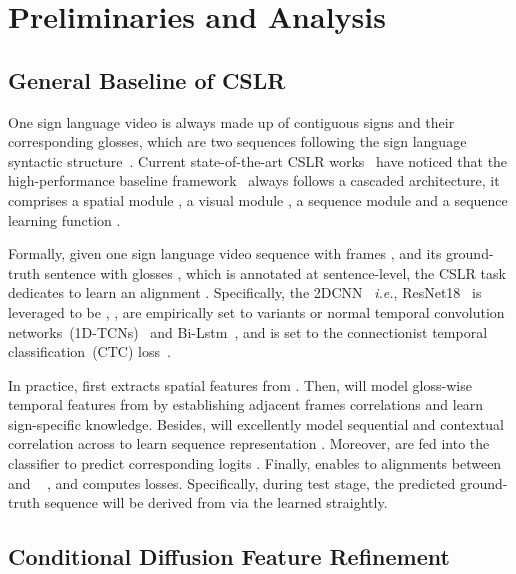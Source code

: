 \documentclass[sigconf]{acmart}
\begin{document}
\section{Preliminaries and Analysis}
\label{sec_pa}

\subsection{General Baseline of CSLR}
\label{sec_base}
One sign language video is always made up of contiguous signs and their corresponding glosses, which are two sequences following the sign language syntactic structure~\cite{sutton1999linguistics}.
Current state-of-the-art CSLR works~\cite{min2021visual,hao2021self,zuo2022c2slr,hu2022temporal,Hu2022SelfEmphasizingNF,hu2023continuous,CVTSLR2023} have noticed that the high-performance baseline framework~ always follows a cascaded architecture, it comprises a spatial module , a visual module , a sequence module  and 
a sequence learning function .

Formally, given one sign language video sequence with  frames , and its ground-truth sentence with  glosses , which is annotated at sentence-level, the CSLR task dedicates to learn an alignment . 
Specifically, the 2DCNN ~\textit{i.e.}, ResNet18~\cite{inproceedingsResnet} is leveraged to be , ,  are empirically set to variants or normal temporal convolution networks~(1D-TCNs)~\cite{min2021visual,hao2021self,zuo2022c2slr,hu2022temporal,chen2022simple,Hu2022SelfEmphasizingNF,hu2023continuous} and Bi-Lstm~\cite{min2021visual,hao2021self,zuo2022c2slr,hu2022temporal,Hu2022SelfEmphasizingNF,hu2023continuous,CVTSLR2023}, and  is set to the connectionist temporal classification~(CTC) loss~\cite{min2021visual,hao2021self,zuo2022c2slr,chen2022simple,hu2022temporal,Hu2022SelfEmphasizingNF,chen2022two,hu2023continuous,CVTSLR2023}.


In practice,  first extracts spatial features  from .
Then,   will model gloss-wise temporal features  from  by establishing adjacent
frames correlations and learn sign-specific knowledge.
Besides,  will excellently model sequential and contextual correlation across  to learn sequence representation .
Moreover,  are fed into the classifier  to predict corresponding logits .
Finally,  enables to alignments between  and ~ , and computes losses.
Specifically, during test stage, the predicted ground-truth sequence  will be derived  from   via the learned   straightly.



\subsection{Conditional Diffusion Feature Refinement}
\label{sec_cdr}
\end{document}
